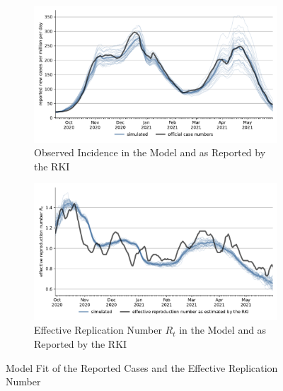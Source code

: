 \begin{figure}[ht]   %
  \centering
  \begin{subfigure}[b]{0.425\textwidth}
    \centering
    \includegraphics[width=\textwidth]{figures/results/figures/scenario_comparisons/combined_fit/full_new_known_case_with_single_runs}
    \caption{Observed Incidence in the Model and as Reported by the RKI}
    \label{fig:aggregated_fit2}
  \end{subfigure}
  \hfill
  \begin{subfigure}[b]{0.425\textwidth}
    \includegraphics[width=\textwidth]{figures/results/figures/scenario_comparisons/combined_fit/full_r_effective_with_single_runs}
    \caption{Effective Replication Number $R_t$ in the Model and as Reported by the RKI}
    \label{fig:fit_r_effective}
  \end{subfigure}

  \caption{Model Fit of the Reported Cases and the Effective Replication Number}
  \label{fig:incidence_and_r_effective}


\end{figure}
